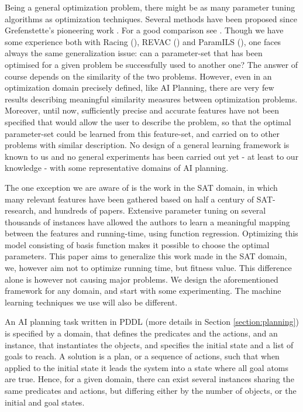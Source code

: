 \documentclass{acm_proc_article-sp}
\begin{document}
Being a general optimization problem, there might be as many parameter tuning algorithms as optimization techniques. Several methods have been proposed  since Grefenstette's pioneering work \cite{Grefenstette86}. For a good comparison see \cite{Montero:2010}. Though we have some experience both with Racing (\cite{bibai:2009}), REVAC (\cite{Nannen07}) and ParamILS (\cite{ParamILS-JAIR}), one faces always the same generalization issue: can a parameter-set that has been optimised for a given problem be successfully used to another one? The answer of course depends on the similarity of the two problems. However, even in an optimization domain precisely defined, like AI Planning, there are very few results describing meaningful similarity measures between optimization problems. Moreover, until now, sufficiently precise and accurate features have not been specified that would allow the user to describe the problem, so that the optimal parameter-set could be learned from this feature-set, and carried on to other problems with similar description. No design of a general learning framework is known to us and no general experiments has been carried out yet - at least to our knowledge - with some representative domains of AI planning.

The one exception we are aware of is the work \cite{Hutter06} in the SAT domain, in which many relevant features have been gathered based on half a century of SAT-research, and hundreds of papers. Extensive parameter tuning on several thousands of instances have allowed the authors to learn a meaningful mapping between the features and running-time, using function regression. Optimizing this model consisting of basis function makes it possible to choose the optimal parameters. This paper aims to generalize this work made in the SAT domain, we, however aim not to optimize running time, but fitness value. This difference alone is however not causing major problems. We design the aforementioned framework for any domain, and start with some experimenting. The machine learning techniques we use will also be different.

An AI planning task written in PDDL (more details in Section \ref{section:planning}) is specified by a domain, that defines the predicates and the actions, and an instance, that instantiates the objects, and specifies the initial state and a list of goals to reach. A solution is a plan, or a sequence of actions, such that when applied to the initial state it leads the system into a state where all goal atoms are true. Hence, for a given domain, there can exist several instances sharing the same predicates and actions, but differing either by the number of objects, or the initial and goal states. 
\end{document}
